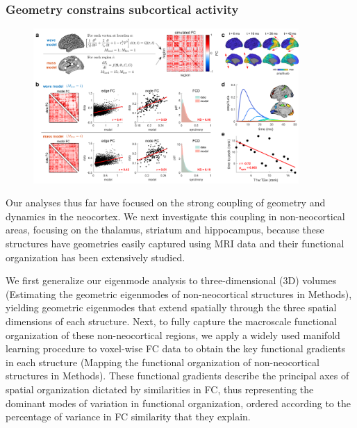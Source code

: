 \documentclass[sn-mathphys-num]{sn-jnl}%
\theoremstyle{thmstyleone}%
\theoremstyle{thmstyletwo}%
\theoremstyle{thmstylethree}%
\begin{document}
\subsubsection{Geometry constrains subcortical activity}
\begin{figure}[!htb]
	\centering
	\includegraphics[width=0.9\textwidth]{fig/fig_4.pdf}
	\caption{
	} \label{fig:4}
\end{figure}


Our analyses thus far have focused on the strong coupling of geometry and dynamics in the neocortex. 
We next investigate this coupling in non-neocortical areas, focusing on the thalamus, striatum and hippocampus, because these structures have geometries easily captured using MRI data and their functional organization has been extensively studied\cite{tian2020topographic}.


We first generalize our eigenmode analysis to three-dimensional (3D) volumes (Estimating the geometric eigenmodes of non-neocortical structures in Methods), yielding geometric eigenmodes that extend spatially through the three spatial dimensions of each structure. 
Next, to fully capture the macroscale functional organization of these non-neocortical regions, we apply a widely used manifold learning procedure to voxel-wise FC data to obtain the key functional gradients in each structure\cite{haak2018connectopic} (Mapping the functional organization of non-neocortical structures in Methods). 
These functional gradients describe the principal axes of spatial organization dictated by similarities in FC, thus representing the dominant modes of variation in functional organization, ordered according to the percentage of variance in FC similarity that they explain.
\end{document}

